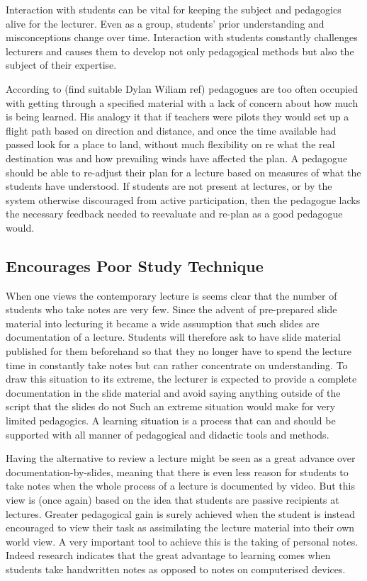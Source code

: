 \documentclass[a4paper,10pt]{article}
\begin{document}
Interaction with students can be vital for keeping the subject and pedagogics alive for the lecturer. Even as a group, students' prior understanding and misconceptions change over time. Interaction with students constantly challenges lecturers and causes them to develop not only pedagogical methods but also the subject of their expertise. 

According to (find suitable Dylan Wiliam ref) pedagogues are too often occupied with getting through a specified material with a lack of concern about how much is being learned. His analogy it that if teachers were pilots they would set up a flight path based on direction and distance, and once the time available had passed look for a place to land, without much flexibility on re what the real destination was and how prevailing winds have affected the plan. A pedagogue should be able to re-adjust their plan for a lecture based on measures of what the students have understood. If students are not present at lectures, or by the system otherwise discouraged from active participation, then the pedagogue lacks the necessary feedback needed to reevaluate and re-plan as a good pedagogue would.



\subsection{Encourages Poor Study Technique}
When one views the contemporary lecture is seems clear that the number of students who take notes are very few. Since the advent of pre-prepared slide material into lecturing it became a wide assumption that such slides are documentation of a lecture. Students will therefore ask to have slide material published for them beforehand so that they no longer have to spend the lecture time in constantly take notes but can rather concentrate on understanding. To draw this situation to its extreme, the lecturer is expected to provide a complete documentation in the slide material and avoid saying anything outside of the script that the slides do not  Such an extreme situation would make for very limited pedagogics. A learning situation is a process that can and should be supported with all manner of pedagogical and didactic tools and methods.

Having the alternative to review a lecture might be seen as a great advance over documentation-by-slides, meaning that there is even less reason for students to take notes when the whole process of a lecture is documented by video. But this view is (once again) based on the idea that students are passive recipients at lectures. Greater pedagogical gain is surely achieved when the student is instead encouraged to view their task as assimilating the lecture material into their own world view. A very important tool to achieve this is the taking of personal notes. Indeed research indicates that the great advantage to learning comes when students take handwritten notes as opposed to notes on computerised devices.
\end{document}

